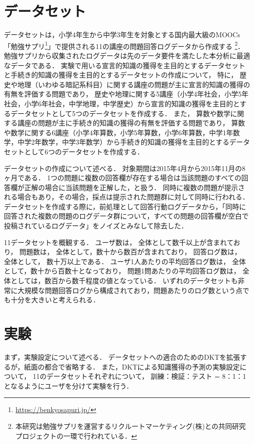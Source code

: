\documentclass[twocolumn,a4j,10pt]{jsarticle}
\begin{document}
\section{データセット}
データセットは，小学4年生から中学3年生を対象とする国内最大級のMOOCs「勉強サプリ\footnote{\url{https://benkyosapuri.jp/}}」で提供される11の講座の問題回答ログデータから作成する
\footnote{本研究は勉強サプリを運営するリクルートマーケティング(株)との共同研究プロジェクトの一環で行われている．}．
勉強サプリから収集されたログデータは先のデータ要件を満たした本分析に最適なデータである．
実験で用いる宣言的知識の獲得を主目的とするデータセットと手続き的知識の獲得を主目的とするデータセットの作成について，
特に，
歴史や地理（いわゆる暗記系科目）に関する講座の問題が主に宣言的知識の獲得の有無を評価する問題であり，
歴史や地理に関する5講座（小学4年社会，小学5年社会，小学6年社会，中学地理，中学歴史）から宣言的知識の獲得を主目的とするデータセットとして5つのデータセットを作成する．
また，
算数や数学に関する講座の問題が主に手続き的知識の獲得の有無を評価する問題であり，
算数や数学に関する6講座（小学4年算数，小学5年算数，小学6年算数，中学1年数学，中学2年数学，中学3年数学）から手続き的知識の獲得を主目的とするデータセットとして6つのデータセットを作成する．

データセットの作成について述べる．
対象期間は2015年4月から2015年11月の8ヶ月である．
1つの問題に複数の回答欄が存在する場合は当該問題のすべての回答欄が正解の場合に当該問題を正解した，と扱う．
同時に複数の問題が提示される場合もあり，その場合，採点は提示された問題群に対して同時に行われる．
データセットを作成する際に，前処理として回答行動ログデータから，「同時に回答された複数の問題のログデータ群について，すべての問題の回答欄が空白で投稿されているログデータ」をノイズとみなして除去した．

11データセットを概観する．
ユーザ数は， 
全体として数千以上が含まれており，
問題数は，
全体として，数十から数百が含まれており，
回答ログ数は，
全体として，
数十万以上である．
ユーザ1人あたりの平均回答ログ数は， 
全体として，数十から百数十となっており，
問題1問あたりの平均回答ログ数は， 
全体としては，数百から数千程度の値となっている．
いずれのデータセットも非常に大規模な問題回答ログから構成されており，問題あたりのログ数という点でも十分を大きいと考えられる．






\section{実験}
まず，実験設定について述べる．
データセットへの適合のためのDKTを拡張するが，紙面の都合で省略する．
また，DKTによる知識獲得の予測の実験設定について，
11のデータセットそれぞれについて，
訓練：検証：テスト = 8：1：1となるようにユーザを分けて実験を行う．
\end{document}
